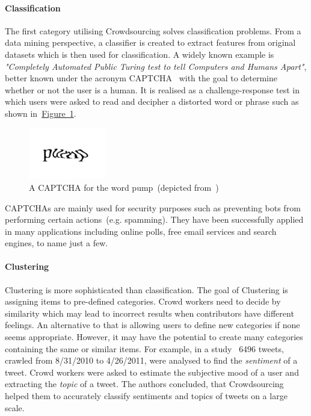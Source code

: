 \paragraph{Classification} The first category utilising Crowdsourcing solves classification problems. From a data mining perspective, a classifier is created to extract features from original datasets which is then used for classification. A widely known example is \emph{"Completely Automated Public Turing test to tell Computers and Humans Apart"}, better known under the acronym CAPTCHA~\cite{ahn2003} with the goal to determine whether or not the user is a human. 
It is realised as a challenge-response test in which users were asked to read and decipher a distorted word or phrase such as shown in~\hyperref[fig:captcha]{Figure~\ref*{fig:captcha}}.
\begin{figure}
	 \centering
	 \includegraphics[width=0.3\textwidth]{drawio/CAPCHA}
	 \caption{A CAPTCHA for the word \guillemotright pump\guillemotleft~(depicted from~\cite{ahn2003})}\label{fig:captcha}
\end{figure}  
CAPTCHAs are mainly used for security purposes such as preventing bots from performing certain actions~(e.g. spamming). They have been successfully applied in many applications including online polls, free email services and search engines, to name just a few. 

\paragraph{Clustering} Clustering is more sophisticated than classification. The goal of Clustering is assigning items to
pre-defined categories. Crowd workers need to decide by similarity which may lead to incorrect results when contributors have different feelings. An alternative to that is allowing users to define new categories if none seems appropriate. However, it may have the potential to create many categories containing the same or similar items. For example, in a study~\cite{huang2013} $6496$ tweets, crawled from 8/31/2010 to 4/26/2011, were analysed to find the \emph{sentiment} of a tweet. Crowd workers were asked to estimate the subjective mood of a user and extracting the \emph{topic} of a tweet. The authors concluded, that Crowdsourcing helped them to accurately classify sentiments and topics of tweets on a large scale. 

